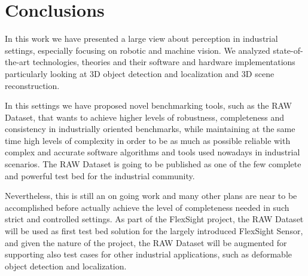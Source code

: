 \chapter{Conclusions}\label{ch:conclusions}
In this work we have presented a large view about perception in industrial settings, especially focusing on robotic and machine vision. We analyzed state-of-the-art technologies, theories and their software and hardware implementations particularly looking at 3D object detection and localization and 3D scene reconstruction.

In this settings we have proposed novel benchmarking tools, such as the RAW Dataset, that wants to achieve higher levels of robustness, completeness and consistency in industrially oriented benchmarks, while maintaining at the same time high levels of complexity in order to be as much as possible reliable with complex and accurate software algorithms and tools used nowadays in industrial scenarios. The RAW Dataset is going to be published as one of the few complete and powerful test bed for the industrial community.

Nevertheless, this is still an on going work and many other plans are near to be accomplished before actually achieve the level of completeness needed in such strict and controlled settings. As part of the FlexSight project, the RAW Dataset will be used as first test bed solution for the largely introduced FlexSight Sensor, and given the nature of the project, the RAW Dataset will be augmented for supporting also test cases for other industrial applications, such as deformable object detection and localization.
